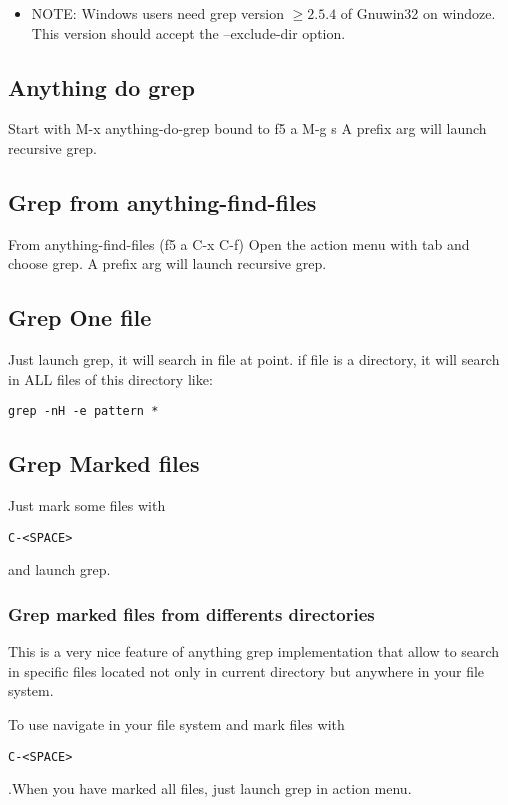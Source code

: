 \documentclass[a4paper,11pt]{article}
\begin{document}
\begin{itemize}
\item NOTE: Windows users need grep version 
\begin{math}
\geq2.5.4
\end{math}
of Gnuwin32 on windoze.
This version should accept the --exclude-dir option.
\end{itemize}

\subsection{Anything do grep}
\label{sec:anything-do-grep}
Start with M-x anything-do-grep bound to f5 a M-g s
A prefix arg will launch recursive grep.

\subsection{Grep from anything-find-files}
\label{sec:grep-from-anything}
From anything-find-files (f5 a C-x C-f) Open the action menu with tab and choose grep.
A prefix arg will launch recursive grep.

\subsection{Grep One file}
\label{sec:grep-one-file}
Just launch grep, it will search in file at point.
if file is a directory, it will search in ALL files of this directory like:

\begin{verbatim}
grep -nH -e pattern *
\end{verbatim}


\subsection{Grep Marked files}
\label{sec:grep-marked-files}
Just mark some files with
\begin{verbatim}
C-<SPACE>
\end{verbatim}
and launch grep.
\subsubsection{Grep marked files from differents directories}
\label{sec:grep-marked-files-1}
This is a very nice feature of anything grep implementation that allow to search in specific files located not
only in current directory but anywhere in your file system.

To use navigate in your file system and mark files with 
\begin{verbatim}
C-<SPACE> 
\end{verbatim}
.When you have marked all files, just launch grep in action menu.
\end{document}
